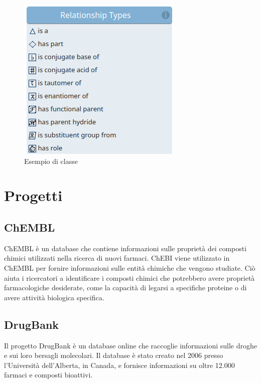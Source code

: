\documentclass[12pt,a4paper,openright,twoside]{book}
\begin{document}
\begin{figure}[H]
	\centering
	\includegraphics[width=\linewidth]{figures/relationship-types.png}
	\caption{Esempio di classe}
	\label{fig:RelationshipTypes}
\end{figure}

\chapter{Progetti}
\label{chap:projects}
\section{ChEMBL}
ChEMBL è un database che contiene informazioni sulle proprietà dei composti chimici utilizzati nella ricerca di nuovi farmaci. ChEBI viene utilizzato in ChEMBL per fornire informazioni sulle entità chimiche che vengono studiate. Ciò aiuta i ricercatori a identificare i composti chimici che potrebbero avere proprietà farmacologiche desiderate, come la capacità di legarsi a specifiche proteine o di avere attività biologica specifica.

\section{DrugBank}
Il progetto DrugBank è un database online che raccoglie informazioni sulle droghe e sui loro bersagli molecolari. Il database è stato creato nel 2006 presso l'Università dell'Alberta, in Canada, e fornisce informazioni su oltre 12.000 farmaci e composti bioattivi.
\end{document}
